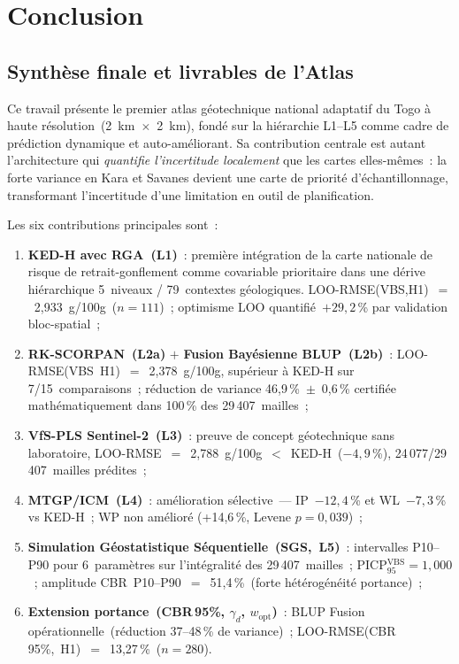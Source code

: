 \documentclass[10pt,a4paper,twocolumn]{article}
\begin{document}
	\section{Conclusion}
	\label{sec:conclusion}
	
	\subsection{Synthèse finale et livrables de l'Atlas}
	
	Ce travail présente le premier atlas géotechnique national adaptatif
	du Togo à haute résolution~(2~km~$\times$~2~km), fondé sur la
	hiérarchie L1--L5 comme cadre de prédiction dynamique et
	auto-améliorant. Sa contribution centrale est autant l'architecture
	qui \emph{quantifie l'incertitude localement} que les cartes elles-mêmes~:
	la forte variance en Kara et Savanes devient une carte de priorité
	d'échantillonnage, transformant l'incertitude d'une limitation en outil
	de planification.

	Les six contributions principales sont~:
	\begin{enumerate}[noitemsep]
		\item \textbf{KED-H avec RGA~(L1)}~: première intégration
		de la carte nationale de risque de retrait-gonflement comme
		covariable prioritaire dans une dérive hiérarchique 5~niveaux /
		79~contextes géologiques.
		LOO-RMSE(VBS,H1)~$=$~2{,}933~g/100g~($n=111$)~;
		optimisme LOO quantifié~$+29{,}2$\,\% par validation bloc-spatial~;

		\item \textbf{RK-SCORPAN~(L2a)} $+$ \textbf{Fusion Bayésienne BLUP~(L2b)}~:
		LOO-RMSE(VBS~H1)~$=$~2{,}378~g/100g, supérieur à KED-H
		sur 7/15~comparaisons~;
		réduction de variance 46{,}9\,\%~$\pm$~0{,}6\,\% certifiée
		mathématiquement dans 100\,\% des 29\,407~mailles~;

		\item \textbf{VfS-PLS Sentinel-2~(L3)}~: preuve de concept
		géotechnique sans laboratoire,
		LOO-RMSE~$=$~2{,}788~g/100g~$<$~KED-H~($-4{,}9$\,\%),
		24\,077/29\,407~mailles prédites~;

		\item \textbf{MTGP/ICM~(L4)}~: amélioration sélective~---
		IP~$-12{,}4$\,\% et WL~$-7{,}3$\,\% vs KED-H~;
		WP non amélioré (+14{,}6\,\%, Levene $p=0{,}039$)~;

		\item \textbf{Simulation Géostatistique Séquentielle~(SGS,~L5)}~:
		intervalles P10--P90 pour 6~paramètres sur l'intégralité des
		29\,407~mailles~;
		PICP$_{95}^{\mathrm{VBS}}=1{,}000$~;
		amplitude CBR~P10--P90~$=$~51{,}4\,\%~(forte hétérogénéité portance)~;

		\item \textbf{Extension portance~(CBR\,95\%, $\gamma_d$, $w_{\mathrm{opt}}$)}~:
		BLUP Fusion opérationnelle~(réduction 37--48\,\% de variance)~;
		LOO-RMSE(CBR\,95\%,~H1)~$=$~13{,}27\,\%~($n=280$).
	\end{enumerate}
	
\end{document}
